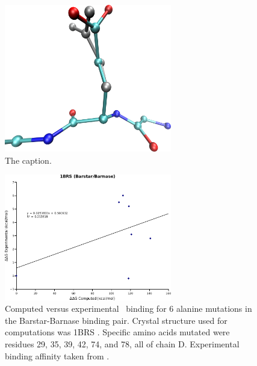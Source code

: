 \begin{figure}[h]
  \centering
  \includegraphics[width=0.65\textwidth,height=0.3\textheight,keepaspectratio]{figures/mutation_side_chain_images/1brs_chain_a_73.png}
  \caption{The caption.}
  \label{figure:computational_mutation_scanning/figname}
\end{figure}
\clearpage

\begin{figure}[h]
  \centering
  \includegraphics[width=0.65\textwidth]{figures/1brs_barstar_barnase.png}
  \caption{
Computed versus experimental \ddg\ binding for 6 alanine mutations in the Barstar-Barnase binding pair.
Crystal structure used for computations was 1BRS \protect\cite{buckle1994protein}.
Specific amino acids mutated were residues 29, 35, 39, 42, 74, and 78, all of chain D.
Experimental binding affinity taken from \protect\cite{thorn2001asedb}.
            }
\end{figure}

